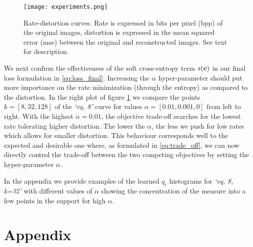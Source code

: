 \documentclass{article} %
\newcommand{\qc}{q_c}
\begin{document}
\begin{figure}[h]
\begin{center}
\texttt{[image: experiments.png]}
\end{center}
\caption{Rate-distortion curves. Rate is expressed in bits per pixel (bpp) of the original images, distortion is expressed in the mean squared error (mse) between the original and reconstructed images. See text for description.}\label{fig:plots}
\end{figure}

We next confirm the effectiveness of the soft cross-entropy term $s({\bm{c}})$ in our final loss formulation in \eqref{eq:loss_final}.
Increasing the $\alpha$ hyper-parameter should put more importance on the rate minimization (through the entropy) as compared to the distortion.
In the right plot of figure \ref{fig:plots} we compare the points $k=[8, 32, 128]$ of the \emph{`vq, 8'} curve for values $\alpha = [0.01, 0.001, 0]$ from left to right.
With the highest $\alpha = 0.01$, the objective trade-off searches for the lowest rate tolerating higher distortion. The lower the $\alpha$, the less we push for low rates which allows for smaller distortion. 
This behaviour corresponds well to the expected and desirable one where, as formulated in \eqref{eq:trade_off}, we can now directly control the trade-off between the two competing objectives by setting the hyper-parameter $\alpha$.

In the appendix we provide examples of the learned $\qc$ histograms for \emph{`vq, 8, k=32'} with different values of $\alpha$ showing the concentration of the measure into a few points in the support for high $\alpha$.







\appendix
\section{Appendix}
\end{document}
